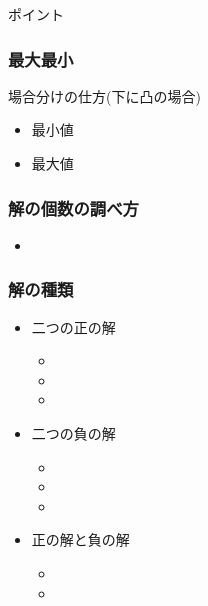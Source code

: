 \documentclass[10pt,dvipdfmx]{jsarticle}
\begin{document}
\begin{itembox}[l]{ポイント}
  \vspace{8mm}
\end{itembox}



\subsubsection*{最大最小}
\begin{itembox}[l]{場合分けの仕方(下に凸の場合)}
  \begin{itemize}
    \item 最小値\vspace{5cm}
    \item 最大値\vspace{5cm}
  \end{itemize}

\end{itembox}

\subsubsection*{解の個数の調べ方}
\begin{large}
  \begin{itemize}
    \item
  \end{itemize}
\end{large}

\subsubsection*{解の種類}
\begin{large}
  \begin{itemize}
    \item 二つの正の解
          \begin{itemize}
            \item \item \item
          \end{itemize}
    \item 二つの負の解
          \begin{itemize}
            \item \item \item
          \end{itemize}
    \item 正の解と負の解
          \begin{itemize}
            \item \item
          \end{itemize}
  \end{itemize}
\end{large}
\end{document}

